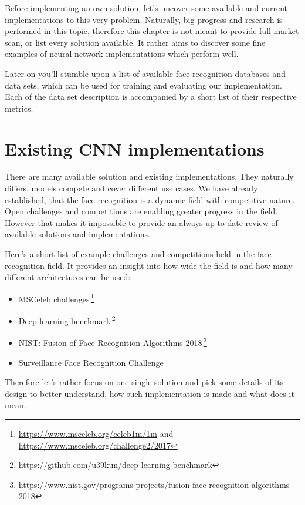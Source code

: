 Before implementing an own solution, let's uncover some available and current implementations to this very problem. Naturally, big progress and research is performed in this topic, therefore this chapter is not meant to provide full market scan, or list every solution available. It rather aims to discover some fine examples of neural network implementations which perform well.

Later on you'll stumble upon a list of available face recognition databases and data sets, which can be used for training and evaluating our implementation. Each of the data set description is accompanied by a short list of their respective metrics.

\section{Existing CNN implementations}

There are many available solution and existing implementations. They naturally differs, models compete and cover different use cases. We have already established, that the face recognition is a dynamic field with competitive nature. Open challenges and competitions are enabling greater progress in the field. However that makes it impossible to provide an always up-to-date review of available solutions and implementations.

Here's a short list of example challenges and competitions held in the face recognition field. It provides an insight into how wide the field is and how many different architectures can be used:

\begin{itemize}
    \item MSCeleb challenges\,\footnote{\url{https://www.msceleb.org/celeb1m/1m} and \url{https://www.msceleb.org/challenge2/2017}}
    \item Deep learning benchmark\,\footnote{\url{https://github.com/u39kun/deep-learning-benchmark}}
    \item NIST: Fusion of Face Recognition Algorithms 2018\,\footnote{\url{https://www.nist.gov/programs-projects/fusion-face-recognition-algorithms-2018}}
    \item Surveillance Face Recognition Challenge\,\cite{sur_challenge}
\end{itemize}

Therefore let's rather focus on one single solution and pick some details of its design to better understand, how such implementation is made and what does it mean.

